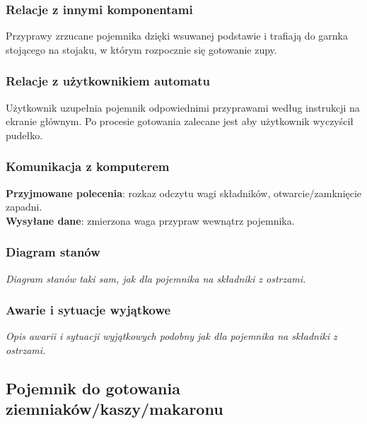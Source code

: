 \documentclass[12pt,a4paper,notitlepage]{article}
\begin{document}
\subsubsection{Relacje z innymi komponentami}
Przyprawy zrzucane pojemnika dzięki wsuwanej podstawie i trafiają do garnka stojącego na stojaku, w którym rozpocznie się gotowanie zupy.

\subsubsection{Relacje z użytkownikiem automatu}
Użytkownik uzupełnia pojemnik odpowiednimi przyprawami według instrukcji na ekranie głównym. Po procesie gotowania zalecane jest aby użytkownik wyczyścił pudełko.

\subsubsection{Komunikacja z komputerem}
\textbf{Przyjmowane polecenia}: rozkaz odczytu wagi składników, otwarcie/zamknięcie zapadni.\\
\textbf{Wysyłane dane}: zmierzona waga przypraw wewnątrz pojemnika.

\subsubsection{Diagram stanów}
\emph{Diagram stanów taki sam, jak dla pojemnika na składniki z ostrzami.}

\subsubsection{Awarie i sytuacje wyjątkowe}
\emph{Opis awarii i sytuacji wyjątkowych podobny jak dla pojemnika na składniki z ostrzami.}


\subsection{Pojemnik do gotowania ziemniaków/kaszy/makaronu}
\end{document}
